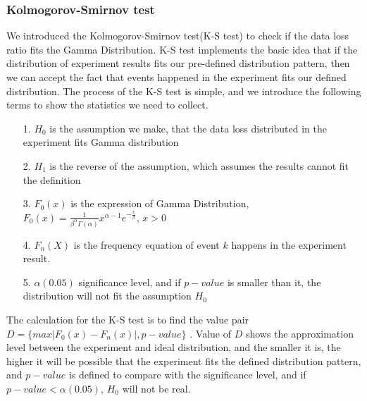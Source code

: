 \documentclass[11pt,openright,a4paper]{report}
\begin{document}
\subsubsection{Kolmogorov-Smirnov test}
We introduced the Kolmogorov-Smirnov test(K-S test) to check if the data loss ratio fits the Gamma Distribution\cite{vlvcek2009daily}. K-S test implements the basic idea that if the distribution of  experiment results fits our pre-defined distribution pattern, then we can accept the fact that events happened in the experiment fits our defined distribution. The process of the K-S test is simple, and we introduce the following terms to show the statistics we need to collect.\\
\begin{itemize}
	\item[1.] $H_{0}$ is the assumption we make, that the data loss distributed in the experiment fits Gamma distribution
	\item[2.] $H_{1}$ is the reverse of the assumption, which assumes the results cannot fit the definition
	\item[3.]  $F_{0}(x)$ is the expression of Gamma Distribution, $F_{0}(x)=\frac{1}{\beta^{\alpha}\Gamma(\alpha)}x^{\alpha-1}e^{-\frac{x}{\beta}}$, $x>0$
	\item[4.] $F_{n}(X)$ is the frequency equation of event $k$ happens in the experiment result.
	\item[5.] $\alpha(0.05)$ significance level, and if $p-value$ is smaller than it, the distribution will not fit the assumption $H_{0}$
\end{itemize}
The calculation for the K-S test is to find the value pair $ D=\{max|F_{0}(x)-F_{n}(x)|, p-value\}$ \cite{rice1989analyzing}. Value of $D$ shows the approximation level between the experiment and ideal distribution, and the smaller it is, the higher it will be possible that the experiment fits the defined distribution pattern, and $p-value$ is defined to compare with the significance level, and if $p-value < \alpha(0.05)$, $H_{0}$ will not be real.\\
\end{document}
